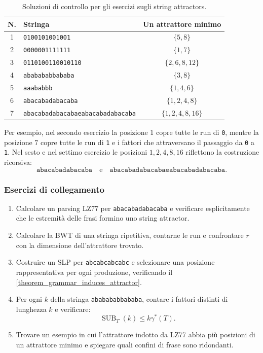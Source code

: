 \documentclass{article}
\theoremstyle{definition}
\numberwithin{equation}{section}
\begin{document}
\begin{table}[htpb]
    \centering
    \small
    \begin{tabular}{c|l|c}
        \textbf{N.} & \textbf{Stringa}                         & \textbf{Un attrattore minimo} \\ \hline
        1           & \texttt{0100101001001}                   & $\{5,8\}$                     \\
        2           & \texttt{0000001111111}                   & $\{1,7\}$                     \\
        3           & \texttt{0110100110010110}                & $\{2,6,8,12\}$                \\
        4           & \texttt{ababababbababa}                  & $\{3,8\}$                     \\
        5           & \texttt{aaababbb}                        & $\{1,4,6\}$                   \\
        6           & \texttt{abacabadabacaba}                 & $\{1,2,4,8\}$                 \\
        7           & \texttt{abacabadabacabaeabacabadabacaba}
                    & $\{1,2,4,8,16\}$
    \end{tabular}
    \caption{Soluzioni di controllo per gli esercizi sugli string attractors.}
    \label{tab:string_attractor_exercises}
\end{table}

Per esempio, nel secondo esercizio la posizione $1$ copre tutte le run di
\texttt{0}, mentre la posizione $7$ copre tutte le run di \texttt{1} e i
fattori che attraversano il passaggio da \texttt{0} a \texttt{1}. Nel sesto e
nel settimo esercizio le posizioni $1,2,4,8,16$ riflettono la costruzione
ricorsiva:
\[
    \texttt{abacabadabacaba}
    \quad\text{e}\quad
    \texttt{abacabadabacabaeabacabadabacaba}.
\]

\subsubsection{Esercizi di collegamento}
\begin{enumerate}
    \item Calcolare un parsing LZ77 per
          \texttt{abacabadabacaba} e verificare esplicitamente che le estremità
          delle frasi formino uno string attractor.
    \item Calcolare la BWT di una stringa ripetitiva, contarne le run e
          confrontare $r$ con la dimensione dell'attrattore trovato.
    \item Costruire un SLP per \texttt{abcabcabcabc} e selezionare una
          posizione rappresentativa per ogni produzione, verificando il
          \autoref{theorem_grammar_induces_attractor}.
    \item Per ogni $k$ della stringa \texttt{ababababbababa}, contare i fattori
          distinti di lunghezza $k$ e verificare:
          \[
              \operatorname{SUB}_T(k)\leq k\gamma^*(T).
          \]
    \item Trovare un esempio in cui l'attrattore indotto da LZ77 abbia più
          posizioni di un attrattore minimo e spiegare quali confini di frase
          sono ridondanti.
\end{enumerate}
\end{document}
